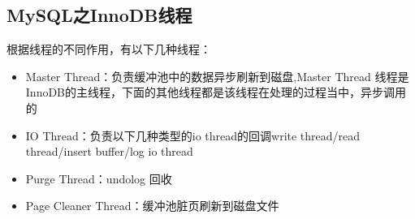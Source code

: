 \documentclass[../../../interview-questions.tex]{subfiles}
\begin{document}
\subsection{MySQL之InnoDB线程}

根据线程的不同作用，有以下几种线程：

\begin{itemize}
    \item {Master Thread：负责缓冲池中的数据异步刷新到磁盘,Master Thread 线程是InnoDB的主线程，下面的其他线程都是该线程在处理的过程当中，异步调用的}
    \item {IO Thread：负责以下几种类型的io thread的回调}write thread/read thread/insert buffer/log io thread
    \item {Purge Thread：undolog 回收}
    \item {Page Cleaner Thread：缓冲池脏页刷新到磁盘文件}
\end{itemize}
\end{document}
